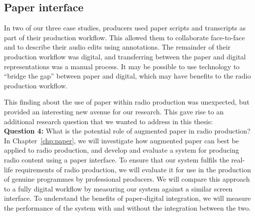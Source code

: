 \subsection{Paper interface}

In two of our three case studies, producers used paper scripts and transcripts as part of their production workflow.
This allowed them to collaborate face-to-face and to describe their audio edits using annotations. The remainder of
their production workflow was digital, and transferring between the paper and digital representations was a manual
process.  It may be possible to use technology to ``bridge the gap'' between paper and digital, which may have benefits
to the radio production workflow.

This finding about the use of paper within radio production was unexpected, but provided an interesting new avenue for
our research. This gave rise to an additional research question that we wanted to address in this thesis:
\\

\noindent
\textbf{Question 4:} What is the potential role of augmented paper in radio production?
\\

In Chapter~\ref{chp:paper}, we will investigate how augmented paper can best be applied to radio production, and
develop and evaluate a system for producing radio content using a paper interface.  To ensure that our system fulfils
the real-life requirements of radio production, we will evaluate it for use in the production of genuine programmes by
professional producers.  We will compare this approach to a fully digital workflow by measuring our system against a
similar screen interface. To understand the benefits of paper-digital integration, we will measure the performance of
the system with and without the integration between the two.

